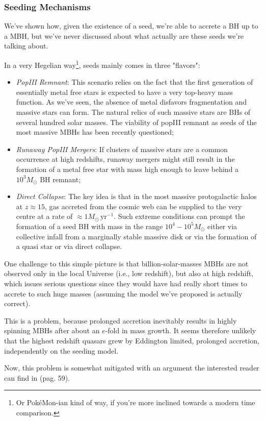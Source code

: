 \subsubsection*{Seeding Mechanisms}
We've shown how, given the existence of a seed, we're able to accrete a BH up to a MBH, but we've never discussed about what actually are these seeds we're talking about.
\par In a very Hegelian way\footnote{Or PokéMon-ian kind of way, if you're more inclined towards a modern time comparison.}, seeds mainly comes in three "flavors":
\begin{itemize}
    \item \emph{PopIII Remnant}: This scenario relies on the fact that the ﬁrst generation of essentially metal free stars is expected to have a very top-heavy mass function. As we've seen, the absence of metal disfavors fragmentation and massive stars can form. The natural relics of such massive stars are BHs of several hundred solar masses. The viability of popIII remnant as seeds of the most massive MBHs has been recently questioned;
    \item \emph{Runaway PopIII Mergers}: If clusters of massive stars are a common occurrence at high redshifts, runaway mergers might still result in the formation of a metal free star with mass high enough to leave behind a $10^{3}M_{\odot}$ BH remnant;
    \item \emph{Direct Collapse}: The key idea is that in the most massive protogalactic halos at $z \approx 15$, gas accreted from the cosmic web can be supplied to the very centre at a rate of $\approx 1M_{\odot}\,\text{yr}^{-1}$. Such extreme conditions can prompt the formation of a seed BH with mass in the range $10^{4}-10^{5}M_{\odot}$ either via collective infall from a marginally stable massive disk or via the formation of a quasi star or via direct collapse.
\end{itemize}
\par One challenge to this simple picture is that billion-solar-masses MBHs are not observed only in the local Universe (i.e., low redshift), but also at high redshift, which issues serious questions since they would have had really short times to accrete to such huge masses (assuming the model we've proposed is actually correct).
\par This is a problem, because prolonged accretion inevitably results in highly spinning MBHs after about an $e$-fold in
mass growth. It seems therefore unlikely that the highest redshift quasars grew by Eddington limited, prolonged accretion, independently on the seeding model.
\par Now, this problem is somewhat mitigated with an argument the interested reader can find in \cite{celoria2018lecturenotesblackhole} (pag. 59).
